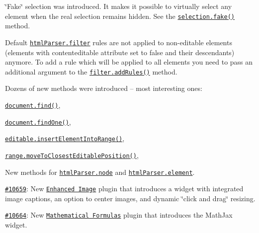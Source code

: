 {\begin{DoxyItemize}
\begin{DoxyItemize}
\begin{DoxyItemize}
\end{DoxyItemize}
\item \char`\"{}\+Fake\char`\"{} selection was introduced. It makes it possible to virtually select any element when the real selection remains hidden. See the \href{http://docs.ckeditor.com/#!/api/CKEDITOR.dom.selection-method-fake}{\tt {\ttfamily selection.\+fake()}} method.
\item Default \href{http://docs.ckeditor.com/#!/api/CKEDITOR.htmlParser.filter}{\tt {\ttfamily html\+Parser.\+filter}} rules are not applied to non-\/editable elements (elements with {\ttfamily contenteditable} attribute set to {\ttfamily false} and their descendants) anymore. To add a rule which will be applied to all elements you need to pass an additional argument to the \href{http://docs.ckeditor.com/#!/api/CKEDITOR.htmlParser.filter-method-addRules}{\tt {\ttfamily filter.\+add\+Rules()}} method.
\item Dozens of new methods were introduced -- most interesting ones\+:
\begin{DoxyItemize}
\item \href{http://docs.ckeditor.com/#!/api/CKEDITOR.dom.document-method-find}{\tt {\ttfamily document.\+find()}},
\item \href{http://docs.ckeditor.com/#!/api/CKEDITOR.dom.document-method-findOne}{\tt {\ttfamily document.\+find\+One()}},
\item \href{http://docs.ckeditor.com/#!/api/CKEDITOR.editable-method-insertElementIntoRange}{\tt {\ttfamily editable.\+insert\+Element\+Into\+Range()}},
\item \href{http://docs.ckeditor.com/#!/api/CKEDITOR.dom.range-method-moveToClosestEditablePosition}{\tt {\ttfamily range.\+move\+To\+Closest\+Editable\+Position()}},
\item New methods for \href{http://docs.ckeditor.com/#!/api/CKEDITOR.htmlParser.node}{\tt {\ttfamily html\+Parser.\+node}} and \href{http://docs.ckeditor.com/#!/api/CKEDITOR.htmlParser.element}{\tt {\ttfamily html\+Parser.\+element}}.
\end{DoxyItemize}
\end{DoxyItemize}
\item \href{http://dev.ckeditor.com/ticket/10659}{\tt \#10659}\+: New \href{http://ckeditor.com/addon/image2}{\tt Enhanced Image} plugin that introduces a widget with integrated image captions, an option to center images, and dynamic \char`\"{}click and drag\char`\"{} resizing.
\item \href{http://dev.ckeditor.com/ticket/10664}{\tt \#10664}\+: New \href{http://ckeditor.com/addon/mathjax}{\tt Mathematical Formulas} plugin that introduces the Math\+Jax widget.

\end{DoxyItemize}}

